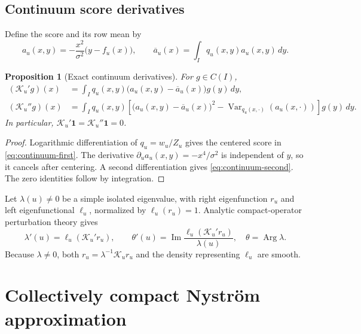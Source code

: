 \documentclass[11pt]{article}
\newtheorem{proposition}[theorem]{Proposition}
\theoremstyle{definition}
\theoremstyle{remark}
\newcommand{\cK}{\mathcal K}
\newcommand{\Arg}{\operatorname{Arg}}
\newcommand{\one}{\mathbf 1}
\begin{document}
\subsection{Continuum score derivatives}

Define the score and its row mean by
\begin{equation}\label{eq:continuum-score}
  a_u(x,y)=-\frac{x^2}{\sigma^2}\bigl(y-f_u(x)\bigr),
  \qquad
  \overline a_u(x)=\int_Iq_u(x,y)a_u(x,y)\,dy.
\end{equation}

\begin{proposition}[Exact continuum derivatives]\label{prop:continuum-derivatives}
For $g\in C(I)$,
\begin{align}
  (\cK_u'g)(x)
  &=\int_Iq_u(x,y)\bigl(a_u(x,y)-\overline a_u(x)\bigr)g(y)\,dy,
  \label{eq:continuum-first}\\
  (\cK_u''g)(x)
  &=\int_Iq_u(x,y)\left[
    \bigl(a_u(x,y)-\overline a_u(x)\bigr)^2
    -\operatorname{Var}_{q_u(x,\cdot)}(a_u(x,\cdot))
  \right]g(y)\,dy.
  \label{eq:continuum-second}
\end{align}
In particular, $\cK_u'\one=\cK_u''\one=0$.
\end{proposition}

\begin{proof}
Logarithmic differentiation of $q_u=w_u/Z_u$ gives the centered score in
\eqref{eq:continuum-first}.  The derivative
$\partial_u a_u(x,y)=-x^4/\sigma^2$ is independent of $y$, so it cancels
after centering.  A second differentiation gives
\eqref{eq:continuum-second}.  The zero identities follow by integration.
\end{proof}

Let $\lambda(u)\ne0$ be a simple isolated eigenvalue, with right eigenfunction
$r_u$ and left eigenfunctional $\ell_u$, normalized by
$\ell_u(r_u)=1$.  Analytic compact-operator perturbation theory gives
\begin{equation}\label{eq:continuum-response}
  \lambda'(u)=\ell_u(\cK_u'r_u),\qquad
  \theta'(u)=\operatorname{Im}\frac{\ell_u(\cK_u'r_u)}{\lambda(u)},
  \quad\theta=\Arg\lambda.
\end{equation}
Because $\lambda\ne0$, both $r_u=\lambda^{-1}\cK_ur_u$ and the density
representing $\ell_u$ are smooth.

\section{Collectively compact Nystr\"om approximation}
\label{sec:nystrom}
\end{document}
